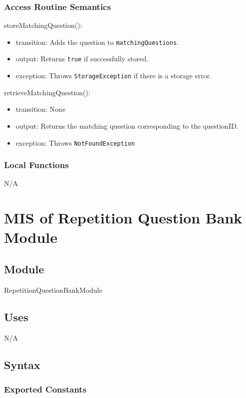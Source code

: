 \documentclass[12pt, titlepage]{article}
\begin{document}
\subsubsection{Access Routine Semantics}

\noindent storeMatchingQuestion():
\begin{itemize}
  \item transition: Adds the question to \texttt{matchingQuestions}.
  \item output: Returns \texttt{true} if successfully stored.
  \item exception: Throws \texttt{StorageException} if there is a storage error.
\end{itemize}

\noindent retrieveMatchingQuestion():
\begin{itemize}
  \item transition: None
  \item output: Returns the matching question corresponding to the questionID.
  \item exception: Throws \texttt{NotFoundException}
\end{itemize}

\subsubsection{Local Functions}

N/A

\section{MIS of Repetition Question Bank Module} \label{RepetitionQuestionBankModule}

\subsection{Module}

RepetitionQuestionBankModule

\subsection{Uses}

N/A

\subsection{Syntax}

\subsubsection{Exported Constants}
\end{document}
